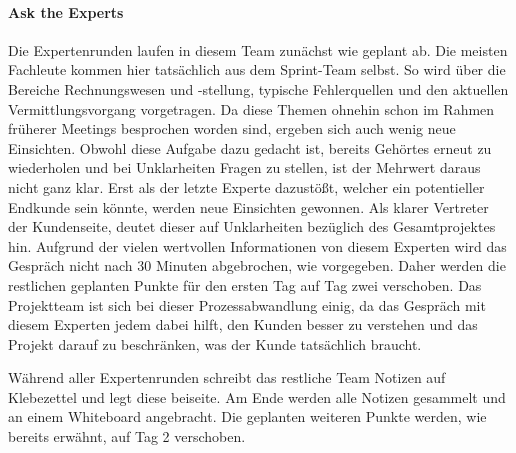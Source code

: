 \paragraph{Ask the Experts}
Die Expertenrunden laufen in diesem Team zunächst wie geplant ab. Die meisten Fachleute kommen hier tatsächlich aus dem Sprint-Team selbst. So wird über die Bereiche Rechnungswesen und -stellung, typische Fehlerquellen und den aktuellen Vermittlungsvorgang vorgetragen. Da diese Themen ohnehin schon im Rahmen früherer Meetings besprochen worden sind, ergeben sich auch wenig neue Einsichten. Obwohl diese Aufgabe dazu gedacht ist, bereits Gehörtes erneut zu wiederholen und bei Unklarheiten Fragen zu stellen, ist der Mehrwert daraus nicht ganz klar. Erst als der letzte Experte dazustößt, welcher ein potentieller Endkunde sein könnte, werden neue Einsichten gewonnen. Als klarer Vertreter der Kundenseite, deutet dieser auf Unklarheiten bezüglich des Gesamtprojektes hin. Aufgrund der vielen wertvollen Informationen von diesem Experten wird das Gespräch nicht nach 30 Minuten abgebrochen, wie vorgegeben. Daher werden die restlichen geplanten Punkte für den ersten Tag auf Tag zwei verschoben. Das Projektteam ist sich bei dieser Prozessabwandlung einig, da das Gespräch mit diesem Experten jedem dabei hilft, den Kunden besser zu verstehen und das Projekt darauf zu beschränken, was der Kunde tatsächlich braucht.

Während aller Expertenrunden schreibt das restliche Team Notizen auf Klebezettel und legt diese beiseite. Am Ende werden alle Notizen gesammelt und an einem Whiteboard angebracht. Die geplanten weiteren Punkte werden, wie bereits erwähnt, auf Tag 2 verschoben.
%
%
%
%
%
%

